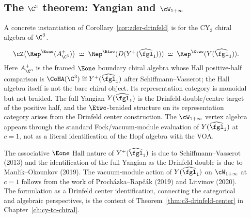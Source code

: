 \subsection{The \texorpdfstring{$\C^3$}{C-3} theorem: Yangian and \texorpdfstring{$\cW_{1+\infty}$}{W-1+inf}}
\label{subsec:c3-yangian}

A concrete instantiation of Corollary~\ref{cor:zder-drinfeld} is for the
CY$_3$ chiral algebra of $\C^3$.

\begin{theorem}
\label{thm:c3-drinfeld-center-restate}
\[
 \cZ\bigl(\Rep^{\Eone}(A^+_{\C^3})\bigr)
 \;\simeq\;
 \Rep^{\Etwo}(D(Y^+(\widehat{\fgl}_1)))
 \;\simeq\;
 \Rep^{\Etwo}(Y(\widehat{\fgl}_1)).
\]
Here $A^+_{\C^3}$ is the framed $\Eone$ boundary chiral algebra whose Hall
positive-half comparison is $\CoHA(\C^3)\cong Y^+(\widehat{\fgl}_1)$ after
Schiffmann--Vasserot; the Hall algebra itself is not the bare chiral object.
Its representation category is monoidal but not braided. The full Yangian
$Y(\widehat{\fgl}_1)$ is the Drinfeld-double/centre target of the positive
half, and the $\Etwo$-braided structure on its representation category arises
from the Drinfeld center construction. The $\cW_{1+\infty}$ vertex algebra
appears through the standard Fock/vacuum-module evaluation of
$Y(\widehat{\fgl}_1)$ at $c = 1$, not as a literal identification of the
Hopf algebra with the VOA.
\end{theorem}

\begin{remark}[Attribution]
\label{rem:c3-drinfeld-attribution}
The associative $\Eone$ Hall nature of $Y^+(\widehat{\fgl}_1)$ is due to
Schiffmann--Vasserot (2013) and the identification of the full
Yangian as the Drinfeld double is due to Maulik--Okounkov (2019).
The vacuum-module action of $Y(\widehat{\fgl}_1)$ on
$\cW_{1+\infty}$ at $c = 1$ follows from the work of
Proch\'azka--Rap\v{c}\'ak (2019) and Litvinov (2020). The formulation as a Drinfeld center
identification, connecting the categorical and algebraic perspectives,
is the content of Theorem~\ref{thm:c3-drinfeld-center} in
Chapter~\ref{ch:cy-to-chiral}.
\end{remark}

